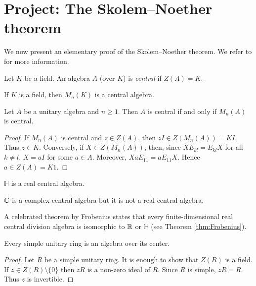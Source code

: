 \section{Project: The Skolem--Noether theorem}

We now present an elementary proof of 
the Skolem--Noether theorem. We refer to 
\cite{MR3308118} for more information. 

\begin{definition}
    Let $K$ be a field. 
	An algebra $A$ (over $K$) is \emph{central} if $Z(A)=K$. 
\end{definition}

If $K$ is a field, then $M_n(K)$ is a central algebra.

\begin{proposition}
	Let $A$ be a unitary algebra and $n\geq1$. Then
	$A$ is central if and only if $M_n(A)$ is central.
\end{proposition}

\begin{proof}
	If $M_n(A)$ is central and $z\in Z(A)$, then
	$zI\in Z(M_n(A))=KI$. Thus
	$z\in K$. Conversely, if $X\in Z(M_n(A))$, then, since 
	$XE_{kl}=E_{kl}X$ for all $k\ne l$, $X=aI$ for some $a\in A$. 
	Moreover, 
	$XaE_{11}=aE_{11}X$. Hence $a\in Z(A)=K1$. 
\end{proof}

\begin{example}
	$\mathbb{H}$ is a real central algebra.
\end{example}

\begin{example}
	$\mathbb{C}$ is a complex central algebra but it is not a real central 
	algebra. 
\end{example}

A celebrated theorem by Frobenius states that every 
finite-dimensional  
real central division algebra is isomorphic to $\mathbb{R}$ or $\mathbb{H}$ (see Theorem \ref{thm:Frobenius}). 

\begin{proposition}
	Every simple unitary ring is an algebra over its center. 
\end{proposition}

\begin{proof}
	Let $R$ be a simple unitary ring. It is enough to show that
	$Z(R)$ is a field. If $z\in
	Z(R)\setminus\{0\}$ then $zR$ is a non-zero ideal of $R$. Since $R$
	is simple, $zR=R$. Thus $z$ is invertible. 
\end{proof}


